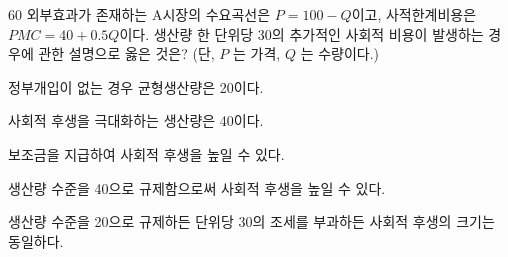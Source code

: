 \begin{question}{60}
외부효과가 존재하는 A시장의 수요곡선은 $P=100-Q$이고, 사적한계비용은 $PMC=40+0.5Q$이다. 생산량 한 단위당 30의 추가적인 사회적 비용이 발생하는 경우에 관한 설명으로 옳은 것은? (단, $P$ 는 가격, $Q$ 는 수량이다.)
\begin{choices}
  \item 정부개입이 없는 경우 균형생산량은 20이다.
  \item 사회적 후생을 극대화하는 생산량은 40이다.
  \item 보조금을 지급하여 사회적 후생을 높일 수 있다.
  \item 생산량 수준을 40으로 규제함으로써 사회적 후생을 높일 수 있다.
  \item 생산량 수준을 20으로 규제하든 단위당 30의 조세를 부과하든 사회적 후생의 크기는 동일하다.
\end{choices}
\end{question}
